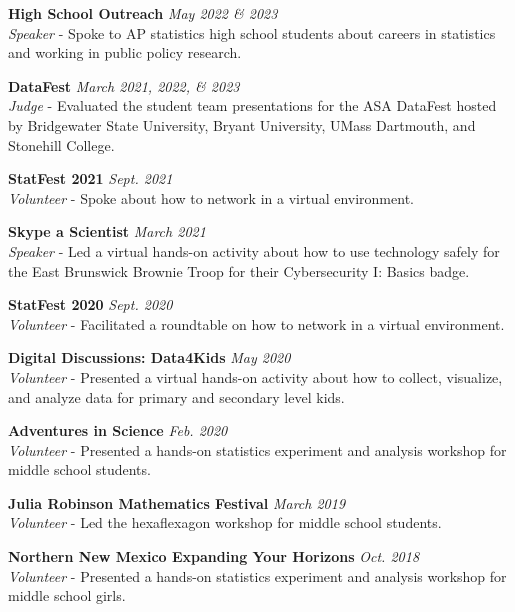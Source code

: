 \textbf{High School Outreach} \hfill \textit{May 2022 \& 2023}\\
\textit{Speaker} - Spoke to AP statistics high school students about careers in statistics and working in public policy research. 
\outreachspace

\textbf{DataFest} \hfill \textit{March 2021, 2022, \& 2023}\\
\textit{Judge} - Evaluated the student team presentations for the ASA DataFest hosted by Bridgewater State University, Bryant University, UMass Dartmouth, and Stonehill College.
\outreachspace

\textbf{StatFest 2021} \hfill \textit{Sept. 2021}\\
\textit{Volunteer} - Spoke about how to network in a virtual environment.

\outreachspace
\textbf{Skype a Scientist} \hfill \textit{March 2021}\\
\textit{Speaker} - Led a virtual hands-on activity about how to use technology safely for the East Brunswick Brownie Troop for their Cybersecurity I: Basics badge.

\outreachspace
\textbf{StatFest 2020} \hfill \textit{Sept. 2020}\\
\textit{Volunteer} - Facilitated a roundtable on how to network in a virtual environment.

\outreachspace
\textbf{Digital Discussions: Data4Kids} \hfill \textit{May 2020}\\
\textit{Volunteer} - Presented a virtual hands-on activity about how to collect, visualize, and analyze data for primary and secondary level kids.

\outreachspace
\textbf{Adventures in Science} \hfill \textit{Feb. 2020}\\
\textit{Volunteer} - Presented a hands-on statistics experiment and analysis workshop for middle school students.

\outreachspace
\textbf{Julia Robinson Mathematics Festival} \hfill \textit{March 2019}\\
\textit{Volunteer} - Led the hexaflexagon workshop for middle school students.

\outreachspace
\textbf{Northern New Mexico Expanding Your Horizons} \hfill \textit{Oct. 2018}\\
\textit{Volunteer} - Presented a hands-on statistics experiment and analysis workshop for middle school girls.

